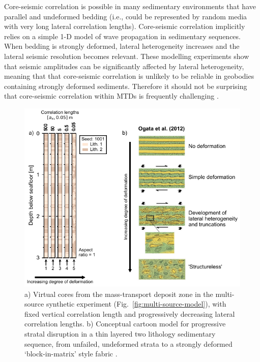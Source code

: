 \documentclass[se,manuscript]{copernicus}
\begin{document}
Core-seismic correlation is possible in many sedimentary environments that have parallel and undeformed bedding (i.e., could be represented by random media with very long lateral correlation lengths).
Core-seismic correlation implicitly relies on a simple 1-D model of wave propagation in sedimentary sequences.
When bedding is strongly deformed, lateral heterogeneity increases and the lateral seismic resolution becomes relevant.
These modelling experiments show that seismic amplitudes can be significantly affected by lateral heterogeneity, meaning that that core-seismic correlation is unlikely to be reliable in geobodies containing strongly deformed sediments.
Therefore it should not be surprising that core-seismic correlation within MTDs is frequently challenging \citep[e.g.,][Fig.~\ref{fig:black-sea-core}, this study]{expedition_316_scientists_expedition_2009, strasser_slumping_2011, sammartini_propagation_2021}.

\begin{figure}
    \includegraphics{figures/fig07.pdf}
    \caption{
        a) Virtual cores from the mass-transport deposit zone in the multi-source synthetic experiment (Fig.~\ref{fig:multi-source-model}), with fixed vertical correlation length and progressively decreasing lateral correlation lengths.
        b) Conceptual cartoon model for progressive stratal disruption in a thin layered two lithology sedimentary sequence, from unfailed, undeformed strata to a strongly deformed `block-in-matrix' style fabric \cite[modified from][]{ogata_mass_2012}.
    }
    \label{fig:multi-source-cores}
\end{figure}
\end{document}
